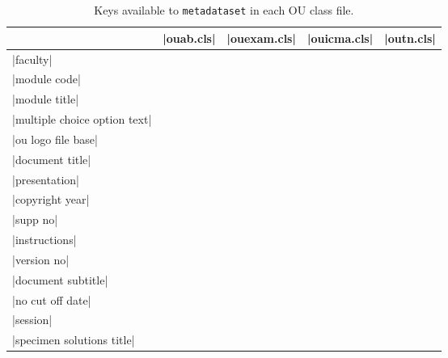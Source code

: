 \documentclass[a4paper]{ltxguide}
\newcommand\3{\unskip\enspace\fbox{\fontsize{4}{4}\selectfont NEW 3.0}}
\newcommand{\metakeyavailable}{\textbullet}
\begin{document}
\begin{longtable}{lcccc}
	\caption{Keys available to \texttt{metadataset} in each OU class file.}\label{tab:metadataset}\\
	\toprule
	                              & |ouab.cls|        & |ouexam.cls|      & |ouicma.cls|      & |outn.cls|        \\
	\midrule
	|faculty|                     & \metakeyavailable & \metakeyavailable & \metakeyavailable & \metakeyavailable \\
	|module code|                 & \metakeyavailable & \metakeyavailable & \metakeyavailable & \metakeyavailable \\
	|module title|                & \metakeyavailable & \metakeyavailable & \metakeyavailable & \metakeyavailable \\
	|multiple choice option text| & \metakeyavailable & \metakeyavailable & \metakeyavailable & \metakeyavailable \\
	|ou logo file base| & \metakeyavailable & \metakeyavailable & \metakeyavailable & \metakeyavailable \\
	\cmidrule{2-5}
	|document title|              & \metakeyavailable &                   & \metakeyavailable & \metakeyavailable \\
	|presentation|                & \metakeyavailable &                   & \metakeyavailable & \metakeyavailable \\
	|copyright year|             & \metakeyavailable & \metakeyavailable &                   & \metakeyavailable \\
	|supp no|                     & \metakeyavailable & \metakeyavailable & \metakeyavailable &                   \\
	|instructions|                & \metakeyavailable & \metakeyavailable & \metakeyavailable &                   \\
	\cmidrule{2-5}
	|version no|                  & \metakeyavailable & \metakeyavailable &                   &                   \\
	\cmidrule{2-5}
	|document subtitle|           & \metakeyavailable &                   &                   &                   \\
	|no cut off date|             & \metakeyavailable &                   &                   &                   \\
	|session|                     &                   & \metakeyavailable &                   &                   \\
	|specimen solutions title|    &                   & \metakeyavailable &                   &                   \\

\end{longtable}
\end{document}
